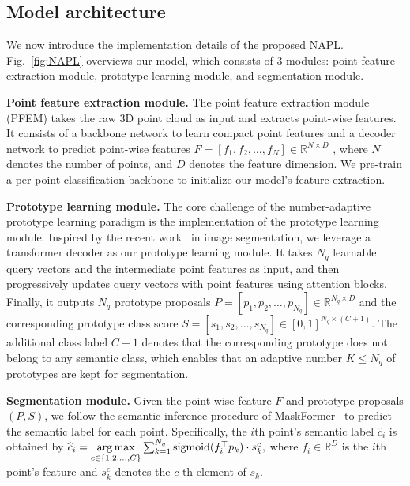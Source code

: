 \documentclass[runningheads]{llncs}
\begin{document}
\subsection{Model architecture}
We now introduce the implementation details of the proposed NAPL. Fig.~\ref{fig:NAPL} overviews our model, which consists of 3 modules: point feature extraction module, prototype learning module, and segmentation module. 

\textbf{Point feature extraction module.} The point feature extraction module (PFEM) takes the raw 3D point cloud as input and extracts point-wise features. It consists of a backbone network to learn compact point features and a decoder network to predict point-wise features $F = \left[f_1, f_2, \dots, f_N \right]\in \mathbb{R}^{N \times D}$ , where $N$ denotes the number of points, and $D$ denotes the feature dimension. We pre-train a per-point classification backbone to initialize our model's feature extraction.

\textbf{Prototype learning module. }
The core challenge of the number-adaptive prototype learning paradigm is the implementation of the prototype learning module.
Inspired by the recent work~\cite{cheng2021per,strudel2021segmenter} in image segmentation, 
we leverage a transformer decoder as our prototype learning module. It takes $N_q$ learnable query vectors and the intermediate point features as input, and then progressively updates query vectors with point features using attention blocks. Finally, it outputs $N_q$ prototype proposals $P = \left[p_1, p_2, \dots, p_{N_q} \right] \in \mathbb{R}^{N_q \times D}$ and the corresponding prototype class score $S = \left[s_1, s_2, \dots, s_{N_q} \right] \in \left[0, 1\right]^{N_q \times (C+1)}$. The additional class label $C+1$ denotes that the corresponding prototype does not belong to any semantic class, which enables that an adaptive number $K \leq N_q$ of prototypes are kept for segmentation.

\textbf{Segmentation module.} Given the point-wise feature $F$ and prototype proposals $(P, S)$, 
we follow the semantic inference procedure of MaskFormer~\cite{cheng2021per} to predict the semantic label for each point. Specifically, the $i$th point's semantic label $\widehat{c}_i$ is obtained by 
$
    \widehat{c}_i = \underset{c\in \{1,2,\dots,C \} }{\arg\max}\sum_{k=1}^{\small N_q}\operatorname{sigmoid}(f_i^{\top}p_k) \cdot s_k^c,
$
where $f_i \in \mathbb{R}^{D}$ is the $i$th point's feature and $s_k^c$ denotes the $c$ th element of $s_k$.
\end{document}
